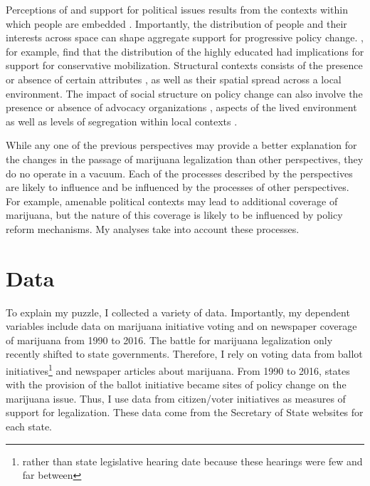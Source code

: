 Perceptions of and support for political issues results from the contexts within which people are embedded \citep{blau_1977a,blau_1977b,mcveigh_and_diaz_2009}. Importantly, the distribution of people and their interests across space can shape aggregate support for progressive policy change. \citet{mcveigh_et_al_2014a}, for example, find that the distribution of the highly educated had implications for support for conservative mobilization. Structural contexts consists of the presence or absence of certain attributes \citep{blau_1977a,blau_1977b,blau_and_duncan_1967}, as well as their spatial spread across a local environment. The impact of social structure on policy change can also involve the presence or absence of advocacy organizations \citep{vann_jr_2018,soule_and_olzak_2004}, aspects of the lived environment \citep{olzak_and_soule_2009} as well as levels of segregation within local contexts \citep{andrews_and_seguin_2015,olzak_et_al_1994}. 







While any one of the previous perspectives may provide a better explanation for the changes in the passage of marijuana legalization than other perspectives, they do no operate in a vacuum. Each of the processes described by the perspectives are likely to influence and be influenced by the processes of other perspectives. For example, amenable political contexts may lead to additional coverage of marijuana, but the nature of this coverage is likely to be influenced by policy reform mechanisms. My analyses take into account these processes.


\section{Data}


To explain my puzzle, I collected a variety of data. Importantly, my dependent variables include data on marijuana initiative voting and on newspaper coverage of marijuana from 1990 to 2016. The battle for marijuana legalization only recently shifted to state governments. Therefore, I rely on voting data from ballot initiatives\footnote{rather than state legislative hearing date because these hearings were few and far between} and newspaper articles about marijuana. From 1990 to 2016, states with the provision of the ballot initiative became sites of policy change on the marijuana issue. Thus, I use data from citizen/voter initiatives as measures of support for legalization. These data come from the Secretary of State websites for each state. 

